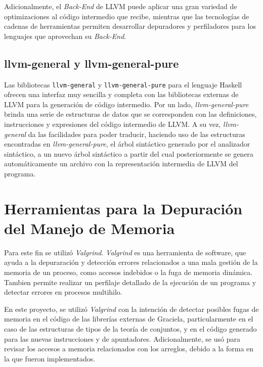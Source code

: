 Adicionalmente, el \textit{Back-End} de LLVM puede aplicar una gran variedad de
optimizaciones al código intermedio que recibe, mientras que las tecnologías de
cadenas de herramientas permiten desarrollar depuradores y perfiladores para los
lenguajes que aprovechan su \textit{Back-End}.

\subsection{llvm-general y llvm-general-pure}

Las bibliotecas \texttt{llvm-general} y \texttt{llvm-general-pure} para el
lenguaje Haskell ofrecen una interfaz muy sencilla y completa con las
bibliotecas externas de LLVM para la generación de código intermedio. Por un
lado, \textit{llvm-general-pure} brinda una serie de estructuras de datos que se
corresponden con las definiciones, instrucciones y expresiones del código
intermedio de LLVM. A su vez, \textit{llvm-general} da las facilidades para
poder traducir, haciendo uso de las estructuras encontradas en
\textit{llvm-general-pure}, el árbol sintáctico generado por el analizador
sintáctico, a un nuevo árbol sintáctico a partir del cual posteriormente se
genera automáticamente un archivo con la representación intermedia de LLVM del
programa.


\section{Herramientas para la Depuración del Manejo de Memoria}

Para este fin se utilizó \textit{Valgrind}. \textit{Valgrind} es una herramienta
de software, que ayuda a la depuraración y detección errores relacionados a una
mala gestión de la memoria de un proceso, como accesos indebidos o la fuga de
memoria dinámica. Tambien permite realizar un perfilaje detallado de la
ejecución de un programa y detectar errores en procesos multihilo.

En este proyecto, se utilizó \textit{Valgrind} con la intención de detectar
posibles fugas de memoria en el código de las librerías externas de Graciela,
particularmente en el caso de las estructuras de tipos de la teoría de
conjuntos, y en el código generado para las nuevas instrucciones  y
 de apuntadores. Adicionalmente, se usó para revisar los accesos a
memoria relacionados con los arreglos, debido a la forma en la que fueron
implementados.


